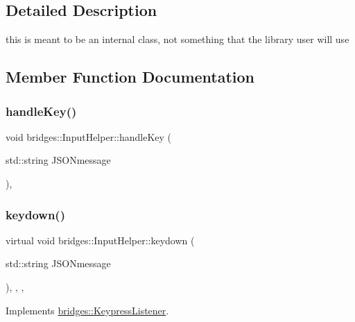 \subsection{Detailed Description}
this is meant to be an internal class, not something that the library user will use 

\subsection{Member Function Documentation}
\mbox{\label{classbridges_1_1_input_helper_a587cde926662934e66c9692243b18340}} 
\subsubsection{\texorpdfstring{handleKey()}{handleKey()}}
{\footnotesize\ttfamily void bridges\+::\+Input\+Helper\+::handle\+Key (\begin{DoxyParamCaption}\item[{std\+::string}]{J\+S\+O\+Nmessage }\end{DoxyParamCaption})\hspace{0.3cm}{\ttfamily [inline]}, {\ttfamily [protected]}}

\mbox{\label{classbridges_1_1_input_helper_a250df70ebe8470f1cb492c17a69c79d7}} 
\subsubsection{\texorpdfstring{keydown()}{keydown()}}
{\footnotesize\ttfamily virtual void bridges\+::\+Input\+Helper\+::keydown (\begin{DoxyParamCaption}\item[{std\+::string}]{J\+S\+O\+Nmessage }\end{DoxyParamCaption})\hspace{0.3cm}{\ttfamily [inline]}, {\ttfamily [override]}, {\ttfamily [protected]}, {\ttfamily [virtual]}}



Implements \mbox{\hyperlink{classbridges_1_1_keypress_listener_a8e94db1517b295a8fc52f5ed7ddc74d0}{bridges\+::\+Keypress\+Listener}}.

